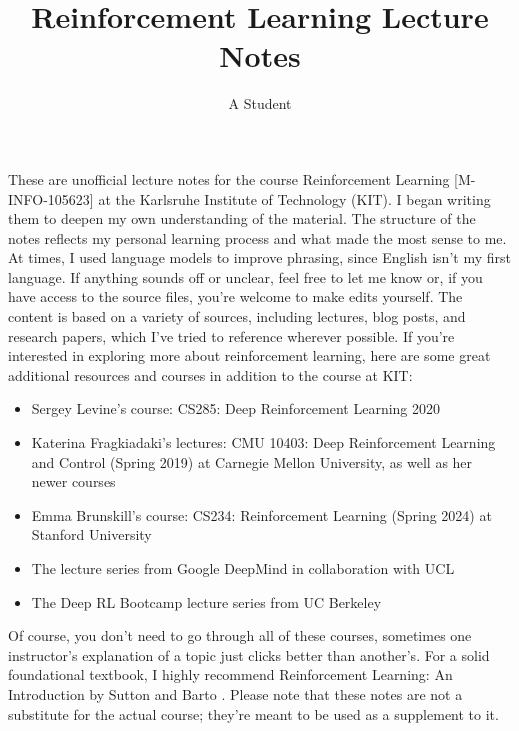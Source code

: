\documentclass{article}
\title{Reinforcement Learning Lecture Notes}
\author{A Student}
\begin{document}
\maketitle
These are unofficial lecture notes for the course Reinforcement Learning [M-INFO-105623] at the Karlsruhe Institute of Technology 
(KIT). I began writing them to deepen my own understanding of the material. The structure of the notes reflects my personal learning process and what made the most sense to me.
At times, I used language models to improve phrasing, since English isn’t my first language. If anything sounds off or unclear, 
feel free to let me know or, if you have access to the source files, you're welcome to make edits yourself.\newline
The content is based on a variety of sources, including lectures, blog posts, and research papers, which I’ve tried to reference 
wherever possible. If you're interested in exploring more about reinforcement learning, here are some great additional resources and courses in addition to the course at KIT:
\begin{itemize}
\item Sergey Levine’s course: CS285: Deep Reinforcement Learning 2020 \cite{CS285LevineYoutube,hafner2019learninglatentdynamicsplanning}
\item Katerina Fragkiadaki’s lectures: CMU 10403: Deep Reinforcement Learning and Control (Spring 2019) at Carnegie Mellon University, as well as her newer courses \cite{DeepRLandControl}
\item Emma Brunskill’s course: CS234: Reinforcement Learning (Spring 2024) at Stanford University \cite{CS234Stanford}
\item The lecture series from Google DeepMind in collaboration with UCL \cite{deepmind_ucl}
\item The Deep RL Bootcamp lecture series from UC Berkeley \cite{DeepRlBootcamp}
\end{itemize}
Of course, you don't need to go through all of these courses, sometimes one instructor's explanation of a topic just clicks 
better than another's. For a solid foundational textbook, I highly recommend Reinforcement Learning: An Introduction by Sutton 
and Barto \cite{10.5555/3312046}.
Please note that these notes are not a substitute for the actual course; they’re meant to be used as a supplement to it.
\newpage
\tableofcontents
\newpage





















%


\end{document}
